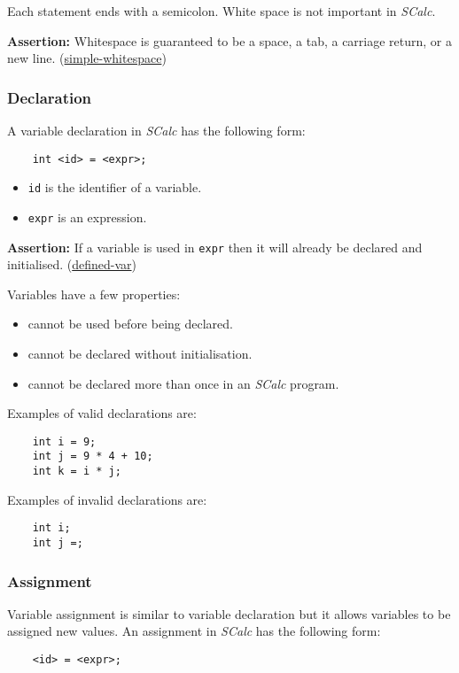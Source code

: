\documentclass{article}
\newcommand{\code}[1]{\texttt{\textmd{#1}}}
\newcommand{\assertion}[2]{\textbf{Assertion: }#1 (\hyperlink{#2}{#2})}
\begin{document}
Each statement ends with a semicolon. White space is not important in \textit{SCalc}.

\assertion{Whitespace is guaranteed to be a space, a tab, a carriage return, or a new
line.}{simple-whitespace}

\subsubsection{Declaration}
\label{sssec:declaration}
A variable declaration in \textit{SCalc} has the following form:
\begin{lstlisting}
	int <id> = <expr>;
\end{lstlisting}

\begin{itemize}
	\item \code{id} is the identifier of a variable.
	\item \code{expr} is an expression.
\end{itemize}

\assertion{If a variable is used in \code{expr} then it will already be declared and initialised.}
{defined-var}

Variables have a few properties:\hypertarget{variable-props}{}
\begin{itemize}
  \item cannot be used before being declared.
  \item cannot be declared without initialisation.
  \item cannot be declared more than once in an \textit{SCalc} program.
\end{itemize}

Examples of valid declarations are:
\begin{lstlisting}
	int i = 9;
	int j = 9 * 4 + 10;
	int k = i * j;
\end{lstlisting}

Examples of invalid declarations are:
\begin{lstlisting}
	int i;
	int j =;
\end{lstlisting}

\subsubsection{Assignment}
\label{sssec:assignment}
Variable assignment is similar to variable declaration but it allows variables to be assigned new
values. An assignment in \textit{SCalc} has the following form:
\begin{lstlisting}
	<id> = <expr>;
\end{lstlisting}
\end{document}
